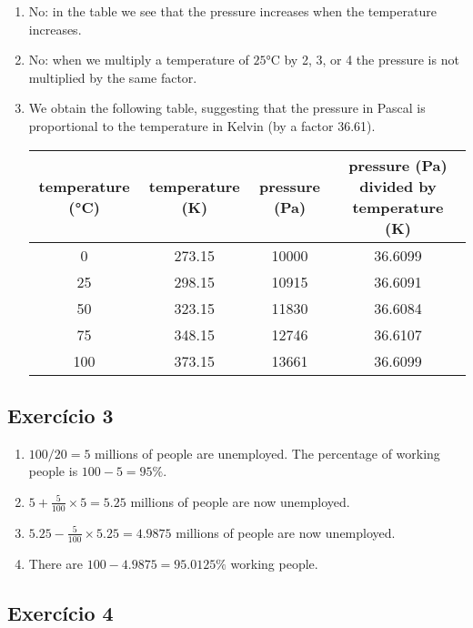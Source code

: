 \begin{enumerate}
\item No: in the table we see that the pressure increases when the temperature
  increases.
\item No: when we multiply a temperature of $25$°C by 2, 3, or 4 the
  pressure is not multiplied by the same factor.
\item We obtain the following table, suggesting that the
  pressure in Pascal is proportional to the temperature in Kelvin
  (by a factor 36.61).

\begin{tabular}{c | c | c | c}
  temperature (°C) & temperature (K) & pressure (Pa) &
  pressure (Pa) divided by temperature (K)
  \\
\hline
0 & 273.15 & 10000 & 36.6099 \\
\hline
25 & 298.15 & 10915 & 36.6091 \\
\hline
50 & 323.15 & 11830 & 36.6084 \\
\hline
75 & 348.15 & 12746 & 36.6107 \\
\hline
100 & 373.15 & 13661 & 36.6099 \\
\hline
\end{tabular}

\end{enumerate}

\subsection*{Exercício 3}

\begin{enumerate}
\item
  $100 / 20 = 5$ millions of people are unemployed.
  The percentage of working people is $100-5=95\%$.
\item
  $5 + \frac{5}{100} \times 5 = 5.25$ millions of people are now unemployed.
\item
  $5.25 - \frac{5}{100} \times 5.25 = 4.9875$ millions of people are now
  unemployed.
\item There are $100 - 4.9875 = 95.0125\%$ working people.
\end{enumerate}

\subsection*{Exercício 4}

